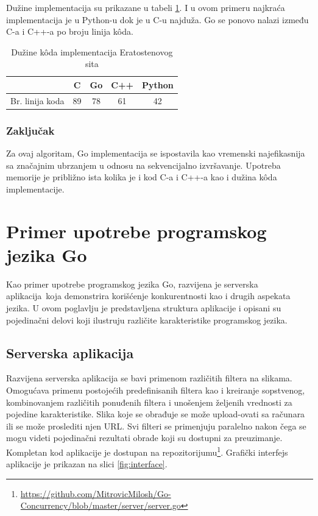 \documentclass[12pt,oneside]{memoir}
\begin{document}
Dužine implementacija su prikazane u tabeli \ref{tab:prime2}. I u ovom primeru najkraća implementacija je u Python-u dok je u C-u najduža. Go se ponovo nalazi između C-a i C++-a po broju linija k\^{o}da.

\begin{table}
\begin{center}
\caption{Dužine k\^{o}da implementacija Eratostenovog sita}
\begin{tabular}{|c|c|c|c|c|}
\hline
		&  C  		&Go 	& C++ & Python 	 \\ \hline
Br. linija koda& 89		& 78	&61	&42		 \\ \hline
\end{tabular}
\label{tab:prime2}
\end{center}
\end{table}


\subsection{Zaključak}

Za ovaj algoritam, Go implementacija se ispostavila kao vremenski najefikasnija sa značajnim ubrzanjem u odnosu na sekvencijalno izvršavanje. Upotreba memorije je približno ista kolika je i kod C-a i C++-a kao i dužina k\^{o}da implementacije.



\chapter{Primer upotrebe programskog jezika Go}

Kao primer upotrebe programskog jezika Go, razvijena je serverska aplikacija\ koja demonstrira korišćenje konkurentnosti kao i drugih aspekata jezika. U ovom poglavlju je predstavljena struktura aplikacije i opisani su pojedinačni delovi koji ilustruju različite karakteristike programskog jezika. 

\section{Serverska aplikacija}

Razvijena serverska aplikacija se bavi primenom različitih filtera na slikama. Omogućava primenu postojećih predefinisanih filtera kao i kreiranje sopstvenog, kombinovanjem različitih ponuđenih filtera i unošenjem željenih vrednosti za pojedine karakteristike. Slika koje se obrađuje se može upload-ovati sa računara ili se može proslediti njen URL. Svi filteri se primenjuju paralelno nakon čega se mogu videti pojedinačni rezultati obrade koji su dostupni za preuzimanje. Kompletan kod aplikacije je dostupan na repozitorijumu\footnote{\url{https://github.com/MitrovicMilosh/Go-Concurrency/blob/master/server/server.go}}. Grafički interfejs aplikacije je prikazan na slici \ref{fig:interface}.
\end{document}
